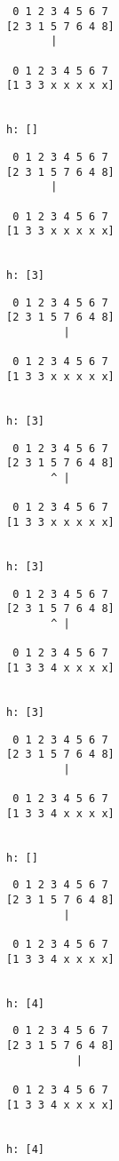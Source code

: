 { \begin{verbatim}
 0 1 2 3 4 5 6 7
[2 3 1 5 7 6 4 8]
       |

 0 1 2 3 4 5 6 7
[1 3 3 x x x x x]


h: []
\end{verbatim} }

{ \begin{verbatim}
 0 1 2 3 4 5 6 7
[2 3 1 5 7 6 4 8]
       |

 0 1 2 3 4 5 6 7
[1 3 3 x x x x x]


h: [3]
\end{verbatim} }

{ \begin{verbatim}
 0 1 2 3 4 5 6 7
[2 3 1 5 7 6 4 8]
         |

 0 1 2 3 4 5 6 7
[1 3 3 x x x x x]


h: [3]
\end{verbatim} }

{ \begin{verbatim}
 0 1 2 3 4 5 6 7
[2 3 1 5 7 6 4 8]
       ^ |

 0 1 2 3 4 5 6 7
[1 3 3 x x x x x]


h: [3]
\end{verbatim} }

{ \begin{verbatim}
 0 1 2 3 4 5 6 7
[2 3 1 5 7 6 4 8]
       ^ |

 0 1 2 3 4 5 6 7
[1 3 3 4 x x x x]


h: [3]
\end{verbatim} }

{ \begin{verbatim}
 0 1 2 3 4 5 6 7
[2 3 1 5 7 6 4 8]
         |

 0 1 2 3 4 5 6 7
[1 3 3 4 x x x x]


h: []
\end{verbatim} }

{ \begin{verbatim}
 0 1 2 3 4 5 6 7
[2 3 1 5 7 6 4 8]
         |

 0 1 2 3 4 5 6 7
[1 3 3 4 x x x x]


h: [4]
\end{verbatim} }

{ \begin{verbatim}
 0 1 2 3 4 5 6 7
[2 3 1 5 7 6 4 8]
           |

 0 1 2 3 4 5 6 7
[1 3 3 4 x x x x]


h: [4]
\end{verbatim} }

